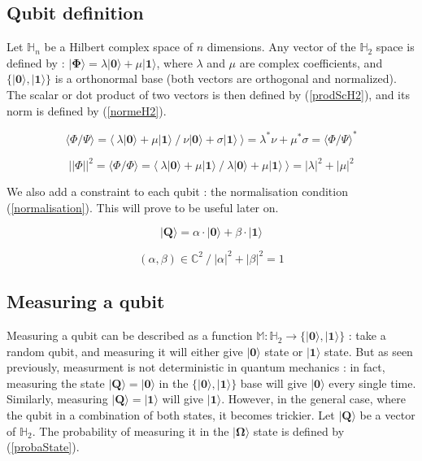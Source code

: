 \documentclass[a4paper,12pt]{report}
\newcommand{\prodSc}[2]{\langle #1 / #2 \rangle}
\newcommand{\quSt}[1]{\bm{|#1\rangle}}
\newcommand{\icite}[1]{\up{\textit{\cite{#1}}}}
\begin{document}
        \subsection{Qubit definition}

\par{
	Let $\mathbb{H}_{n}$ be a Hilbert complex space of $n$ dimensions. Any vector of the $\mathbb{H}_{2}$ space is defined by : $\quSt{\Phi} = \lambda \quSt{0} + \mu \quSt{1}$, where $\lambda$ and $\mu$ are complex coefficients, and $\{\quSt{0}, \quSt{1} \}$ is a orthonormal base (both vectors are orthogonal and normalized). The scalar or dot product of two vectors is then defined by (\ref{prodScH2}), and its norm is defined by (\ref{normeH2}).
}

\begin{equation} \label{prodScH2}
	 \prodSc{\Phi}{\Psi} = \langle ~ \lambda \quSt{0} + \mu \quSt{1} ~/~ \nu \quSt{0} + \sigma \quSt{1} ~\rangle = \lambda^* \nu + \mu^* \sigma = \prodSc{\Phi}{\Psi}^*
\end{equation}

\begin{equation} \label{normeH2}
	 || \Phi ||^2 = \prodSc{\Phi}{\Phi} = \langle ~ \lambda \quSt{0} + \mu \quSt{1} ~/~ \lambda \quSt{0} + \mu \quSt{1} ~\rangle = |\lambda|^2 + |\mu|^2
\end{equation}

\vspace{1\baselineskip}

\par{
	We also add a constraint to each qubit : the normalisation condition (\ref{normalisation}). This will prove to be useful later on.
}

\begin{equation} \label{QuBit}
	\quSt{Q} = \alpha \cdot \quSt{0} + \beta \cdot \quSt{1}
\end{equation}

\begin{equation} \label{normalisation}
	(\alpha,\beta) \in \mathbb{C}^2 ~/~ |\alpha|^2 + |\beta|^2 = 1
\end{equation}

        \subsection{Measuring a qubit}

\par{
	Measuring a qubit\icite{ref2} can be described as a function $\mathbb{M} : \mathbb{H}_{2} \rightarrow \{ \quSt{0}, \quSt{1} \}$ : take a random qubit, and measuring it will either give $\quSt{0}$ state or $\quSt{1}$ state. But as seen previously, measurment is not deterministic in quantum mechanics : in fact, measuring the state $\quSt{Q} = \quSt{0}$ in the $\{\quSt{0}, \quSt{1} \}$ base will give $\quSt{0}$ every single time. Similarly, measuring $\quSt{Q} = \quSt{1}$ will give $\quSt{1}$. However, in the general case, where the qubit in a combination of both states, it becomes trickier. Let $\quSt{Q}$ be a vector of $\mathbb{H}_{2}$. The probability of measuring it in the $\quSt{\Omega}$ state is defined by (\ref{probaState}).
}
\end{document}
